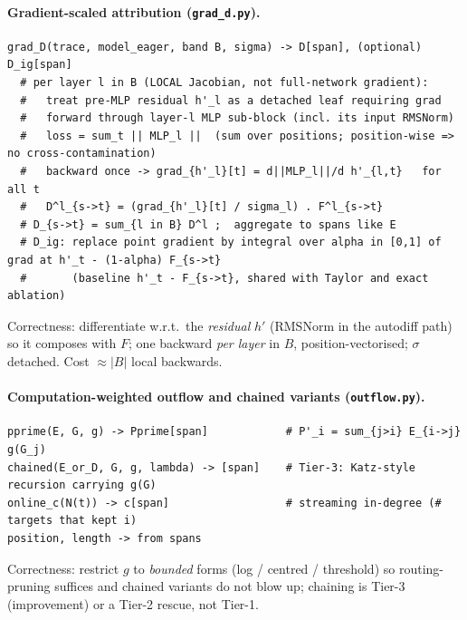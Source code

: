 \documentclass[11pt]{article}
\begin{document}
\paragraph{Gradient-scaled attribution (\texttt{grad\_d.py}).}
\begin{lstlisting}
grad_D(trace, model_eager, band B, sigma) -> D[span], (optional) D_ig[span]
  # per layer l in B (LOCAL Jacobian, not full-network gradient):
  #   treat pre-MLP residual h'_l as a detached leaf requiring grad
  #   forward through layer-l MLP sub-block (incl. its input RMSNorm)
  #   loss = sum_t || MLP_l ||  (sum over positions; position-wise => no cross-contamination)
  #   backward once -> grad_{h'_l}[t] = d||MLP_l||/d h'_{l,t}   for all t
  #   D^l_{s->t} = (grad_{h'_l}[t] / sigma_l) . F^l_{s->t}
  # D_{s->t} = sum_{l in B} D^l ;  aggregate to spans like E
  # D_ig: replace point gradient by integral over alpha in [0,1] of grad at h'_t - (1-alpha) F_{s->t}
  #       (baseline h'_t - F_{s->t}, shared with Taylor and exact ablation)
\end{lstlisting}
Correctness: differentiate w.r.t.\ the \emph{residual} $h'$ (RMSNorm in the autodiff path) so it composes
with $F$; one backward \emph{per layer} in $B$, position-vectorised; $\sigma$ detached. Cost $\approx|B|$
local backwards.

\paragraph{Computation-weighted outflow and chained variants (\texttt{outflow.py}).}
\begin{lstlisting}
pprime(E, G, g) -> Pprime[span]            # P'_i = sum_{j>i} E_{i->j} g(G_j)
chained(E_or_D, G, g, lambda) -> [span]    # Tier-3: Katz-style recursion carrying g(G)
online_c(N(t)) -> c[span]                  # streaming in-degree (# targets that kept i)
position, length -> from spans
\end{lstlisting}
Correctness: restrict $g$ to \emph{bounded} forms (log / centred / threshold) so routing-pruning suffices
and chained variants do not blow up; chaining is Tier-3 (improvement) or a Tier-2 rescue, not Tier-1.
\end{document}
